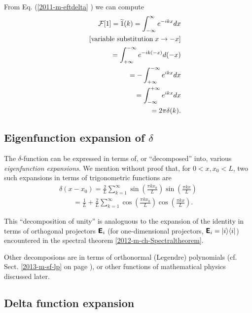 From Eq. (\ref{2011-m-eftdelta} ) we can compute
\begin{equation}
\begin{split}
{\cal F}[1]=\widetilde{1}(k)=   \int_{-\infty}^\infty    e^{-i{kx}} dx   \\
\qquad [\textrm{variable substitution}\; x \rightarrow -x]\\
\qquad =   \int_{+\infty}^{-\infty}    e^{-i{k(-x)}} d(-x)   \\
\qquad =  - \int_{+\infty}^{-\infty}    e^{i{kx}} dx   \\
\qquad =    \int_{-\infty}^{+\infty}    e^{i{kx}} dx   \\
\qquad =    2\pi \delta (k)
.
\end{split}
\label{2011-m-eftdelta1}
\end{equation}


\subsection{Eigenfunction expansion of $\delta$}
\label{2012-m-efed1}

The  $\delta$-function can be expressed  in terms of, or ``decomposed'' into, various
{\em eigenfunction expansions}.
We mention without proof
\cite{duffy2001} that, for $0< x,x_0 <L$,
two such expansions in terms of trigonometric functions are
\begin{equation}
\begin{split}
\delta (x-x_0) =
\frac{2}{L}
\sum_{k=1}^\infty
\sin \left( \frac{\pi k x_0}{L}\right)
\sin \left( \frac{\pi k x}{L}\right)\\
\qquad  =
\frac{1}{L}
+
\frac{2}{L}
\sum_{k=1}^\infty
\cos \left( \frac{\pi k x_0}{L}\right)
\cos \left( \frac{\pi k x}{L}\right).
\end{split}
\label{2012-m-efed}
\end{equation}

This ``decomposition of unity'' is analoguous to the expansion of the identity in terms of orthogonal projectors
$\textsf{\textbf{E}}_i$  (for one-dimensional projectors, $\textsf{\textbf{E}}_i=\vert i\rangle \langle i \vert $)
encountered in the spectral theorem \ref{2012-m-ch-Spectraltheorem}.

Other decomposions are in terms of orthonormal (Legendre) polynomials (cf. Sect. \ref{2013-m-sf-lp} on page \pageref{2013-m-sf-lp}),
or other functions of mathematical physics discussed later.

\subsection{Delta function expansion}
\label{2012-m-dfex}

